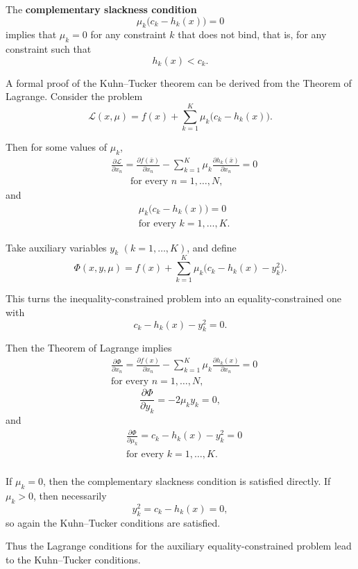 \medskip

The \textbf{complementary slackness condition}
\[
\mu_k\bigl(c_k-h_k(x)\bigr)=0
\]
implies that $\mu_k=0$ for any constraint $k$ that does not bind, that is,
for any constraint such that
\[
h_k(x) < c_k.
\]

\medskip

A formal proof of the Kuhn--Tucker theorem can be derived from the
Theorem of Lagrange. Consider the problem
\[
\mathcal{L}(x,\mu)
=
f(x)+\sum_{k=1}^K \mu_k\bigl(c_k-h_k(x)\bigr).
\]

Then for some values of $\mu_k$,
\[
\begin{aligned}
&\frac{\partial \mathcal{L}}{\partial x_n}
=
\frac{\partial f(\bar x)}{\partial x_n}
-
\sum_{k=1}^K \mu_k \frac{\partial h_k(\bar x)}{\partial x_n}
=0\\
&\qquad \text{for every } n=1,\dots,N,
\end{aligned}
\]
and
\[
\begin{aligned}
&\mu_k\bigl(c_k-h_k(x)\bigr)=0\\
&\text{for every } k=1,\dots,K.
\end{aligned}
\]

Take auxiliary variables $y_k$ $(k=1,\dots,K)$, and define
\[
\Phi(x,y,\mu)
=
f(x)+\sum_{k=1}^K \mu_k\bigl(c_k-h_k(x)-y_k^2\bigr).
\]

This turns the inequality-constrained problem into an equality-constrained one
with
\[
c_k-h_k(x)-y_k^2=0.
\]

Then the Theorem of Lagrange implies
\[
\begin{aligned}
&\frac{\partial \Phi}{\partial x_n}
=
\frac{\partial f(x)}{\partial x_n}
-
\sum_{k=1}^K \mu_k \frac{\partial h_k(x)}{\partial x_n}
=0\\
&\text{for every } n=1,\dots,N,
\end{aligned}\]
\[
\frac{\partial \Phi}{\partial y_k}=-2\mu_k y_k=0,
\]
and
\[
\begin{aligned}
&\frac{\partial \Phi}{\partial \mu_k}
=
c_k-h_k(x)-y_k^2=0\\
&\text{for every } k=1,\dots,K.
\end{aligned}\]\\

If $\mu_k=0$, then the complementary slackness condition is satisfied directly.
If $\mu_k>0$, then necessarily
\[
y_k^2 = c_k-h_k(x)=0,
\]
so again the Kuhn--Tucker conditions are satisfied.

Thus the Lagrange conditions for the auxiliary equality-constrained problem
lead to the Kuhn--Tucker conditions.

